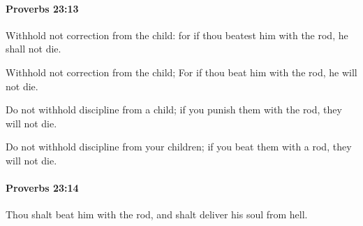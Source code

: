 		\paragraph{Proverbs 23:13} %
			\label{PROVERBS-23-13}

			Withhold not correction from the child: for if thou beatest him with the rod, he shall not die.

			\begin{versebox}
					\item[BHS] 
					\item[ASV] Withhold not correction from the child; For if thou beat him with the rod, he will not die.
					\item[NIV] Do not withhold discipline from a child; if you punish them with the rod, they will not die.
					\item[NRSV] Do not withhold discipline from your children; if you beat them with a rod, they will not die.
			\end{versebox}

		\paragraph{Proverbs 23:14} %
			\label{PROVERBS-23-14}

			Thou shalt beat him with the rod, and shalt deliver his soul from hell.

